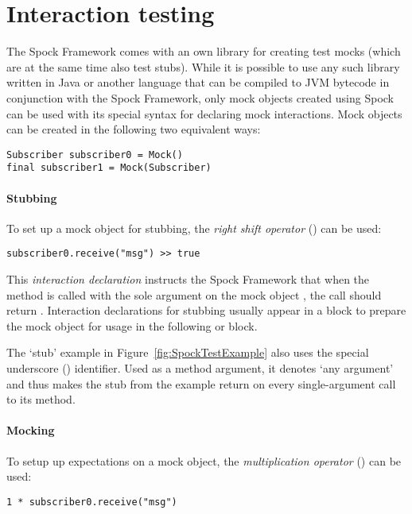 \section{Interaction testing}
The Spock Framework comes with an own library
for creating test mocks
(which are at the same time also test stubs).
While it is possible to use any such library
written in Java or another language
that can be compiled to JVM bytecode
in conjunction with the Spock Framework,
only mock objects created using Spock
can be used with its special syntax
for declaring mock interactions.
Mock objects can be created in the following two equivalent ways:
\autocite[Chapter: Interaction Based Testing - Creating Mock Objects]{SpockFrameworkDoc}
\begin{verbatim}
Subscriber subscriber0 = Mock()
final subscriber1 = Mock(Subscriber)
\end{verbatim}

\paragraph{Stubbing}
To set up a mock object for stubbing,
the \textit{right shift operator} (\code{<<}) can be used:
\begin{verbatim}
subscriber0.receive("msg") >> true
\end{verbatim}

This \textit{interaction declaration} instructs the Spock Framework that when
the method  is called with
the sole argument  on
the mock object ,
the call should return .
Interaction declarations for stubbing usually appear in a  block
to prepare the mock object for usage in the following  or  block.

The `stub' example in Figure~\ref{fig:SpockTestExample}
also uses the special underscore (\code{_}) identifier.
Used as a method argument, it denotes `any argument'
and thus makes the stub from the example return 
on every single-argument call to its  method.

\paragraph{Mocking}
To setup up expectations on a mock object,
the \textit{multiplication operator} (\code{*}) can be used:
\begin{verbatim}
1 * subscriber0.receive("msg")
\end{verbatim}

